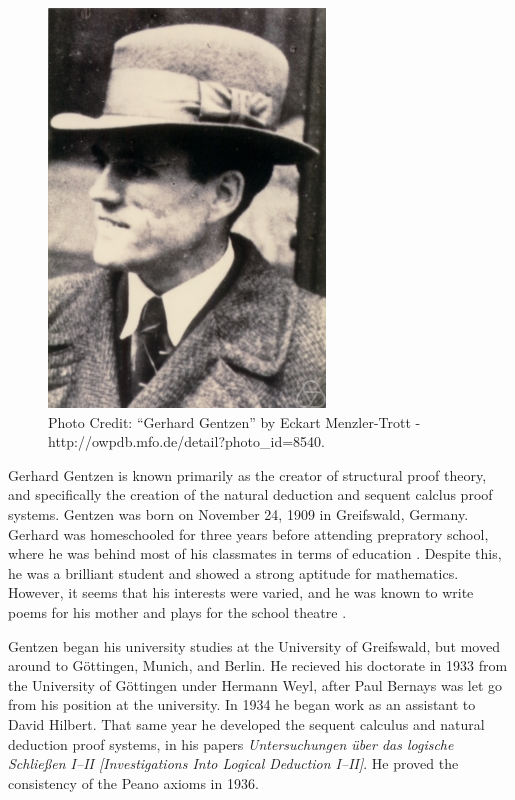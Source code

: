 \documentclass[../../../include/open-logic-section]{subfiles}
\begin{document}

\begin{figure}[h!] 
\centering
\includegraphics[scale=0.55]{gerhard-gentzen.jpg} 
\caption{Photo Credit: ``Gerhard Gentzen'' by Eckart Menzler-Trott - 
http://owpdb.mfo.de/detail?photo_id=8540.}
\end{figure}

Gerhard Gentzen is known primarily as the creator of structural proof
theory, and specifically the creation of the natural deduction and 
sequent calclus proof systems. Gentzen was born on November 24, 1909 in 
Greifswald, Germany. Gerhard was homeschooled for three years before 
attending prepratory school, where he was behind most of his classmates in
 terms of education \citep[12]{Menzler-Trott2007}. Despite this, he was a
 brilliant student and showed a strong aptitude for mathematics. However,
it seems that his interests were varied, and he was known to write poems for 
his mother and plays for the school theatre \citep[11, 13]{Menzler-Trott2007}.

Gentzen began his university studies at the University of Greifswald, but
moved around to G\"{o}ttingen, Munich, and Berlin. He recieved his
doctorate in 1933 from the University of G\"{o}ttingen under Hermann Weyl,
after Paul Bernays was let go from his position at the university.
In 1934 he began work as an assistant to David Hilbert. That same year he
developed the sequent calculus and natural deduction proof systems, in his
papers \emph{Untersuchungen \"{u}ber das logische Schlie\ss en
I--II [Investigations Into Logical Deduction I--II]}. He proved the consistency
 of the Peano axioms in 1936.
\end{document}
